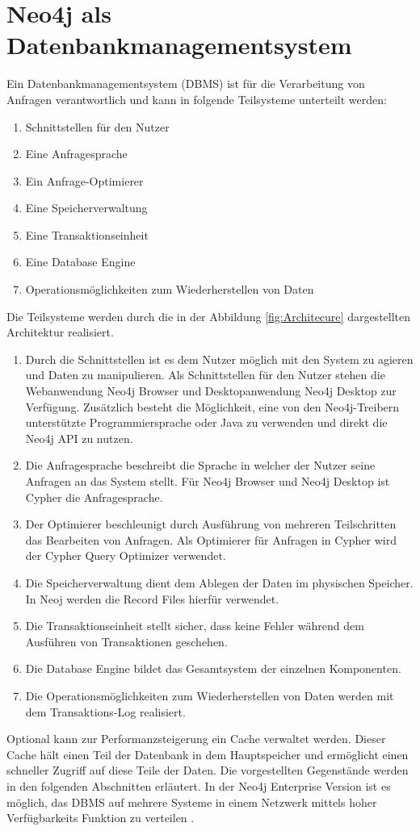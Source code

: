 \section{Neo4j als Datenbankmanagementsystem}
Ein Datenbankmanagementsystem (DBMS) ist für die Verarbeitung von Anfragen verantwortlich und kann in folgende Teilsysteme unterteilt werden\parencite{angles2012comparison}:
\begin{enumerate}
	\item Schnittstellen für den Nutzer
	\item Eine Anfragesprache
	\item Ein Anfrage-Optimierer
	\item Eine Speicherverwaltung
	\item Eine Transaktionseinheit
	\item Eine Database Engine
	\item Operationsmöglichkeiten zum Wiederherstellen von Daten
\end{enumerate}
Die Teilsysteme werden durch die in der Abbildung \ref{fig:Architecure} dargestellten Architektur realisiert.
\begin{enumerate}
	\item Durch die Schnittstellen ist es dem Nutzer möglich mit den System zu agieren und Daten zu manipulieren. Als Schnittstellen für den Nutzer stehen die Webanwendung Neo4j Browser und Desktopanwendung Neo4j Desktop zur Verfügung. Zusätzlich besteht die Möglichkeit, eine von den Neo4j-Treibern unterstützte Programmiersprache  oder  Java zu verwenden und direkt die Neo4j API zu nutzen. 
	\item
	Die Anfragesprache  beschreibt die Sprache in welcher der Nutzer seine Anfragen an das System stellt. Für Neo4j Browser und Neo4j Desktop ist Cypher die Anfragesprache.
	\item Der Optimierer beschleunigt durch Ausführung von mehreren Teilschritten das Bearbeiten von Anfragen. Als Optimierer für Anfragen in Cypher wird der Cypher Query Optimizer verwendet\parencite{Optimizer}. 
	\item Die Speicherverwaltung dient dem Ablegen der Daten im physischen Speicher. In Neoj werden die Record Files hierfür verwendet.
	\item Die Transaktionseinheit stellt sicher, dass keine Fehler während dem Ausführen von Transaktionen geschehen. 
	\item Die Database Engine bildet das Gesamtsystem der einzelnen Komponenten.\item Die Operationsmöglichkeiten zum Wiederherstellen von Daten werden mit dem Transaktions-Log realisiert.
\end{enumerate}
Optional kann zur  Performanzsteigerung ein Cache verwaltet werden. Dieser Cache hält einen Teil der Datenbank in dem Hauptspeicher und ermöglicht einen schneller Zugriff auf diese Teile der Daten. Die vorgestellten Gegenstände werden in den folgenden Abschnitten erläutert. In der Neo4j Enterprise Version ist es möglich, das DBMS auf mehrere Systeme in einem Netzwerk mittels hoher Verfügbarkeits Funktion zu verteilen \parencite{vukotic2015neo4j}.

